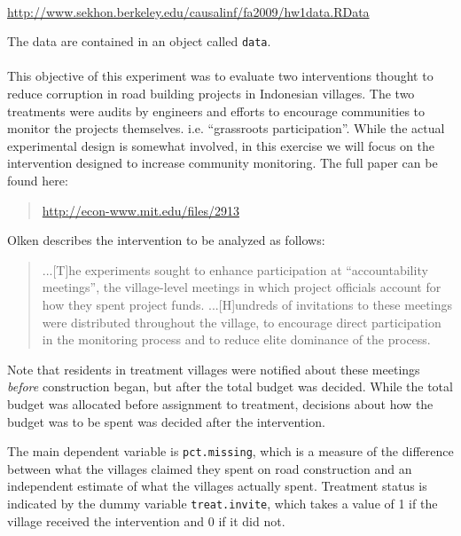 \documentclass{article}
\begin{document}
\paragraph{}
\url{http://www.sekhon.berkeley.edu/causalinf/fa2009/hw1data.RData}

The data are contained in an object called \texttt{data}.
\paragraph{}
This objective of this experiment was to evaluate two interventions
thought to reduce corruption in road building projects in Indonesian
villages. The two treatments were audits by engineers and efforts to
encourage communities to monitor the projects
themselves. i.e. ``grassroots participation''.  While the actual
experimental design is somewhat involved, in this exercise we will
focus on the intervention designed to increase community
monitoring. The full paper can be found here:
\begin{quote}
  \url{http://econ-www.mit.edu/files/2913}
\end{quote}


Olken describes the intervention to be analyzed as follows:
\begin{quote}
  ...[T]he experiments sought to enhance participation at
  ``accountability meetings'', the village-level meetings in which
  project officials account for how they spent project
  funds. ...[H]undreds of invitations to these meetings were
  distributed throughout the village, to encourage direct
  participation in the monitoring process and to reduce elite
  dominance of the process. 
\end{quote}
Note that residents in treatment villages were notified about these meetings
\textit{before} construction began, but after the total budget
was decided. While the total budget was allocated before assignment to treatment, decisions about how the budget was to be spent was decided after the intervention. 

The main dependent variable is \texttt{pct.missing}, which is a
measure of the difference between what the villages claimed they spent
on road construction and an independent estimate of what the villages
actually spent. Treatment status is indicated by the dummy variable
\texttt{treat.invite}, which takes a value of 1 if the village
received the intervention and 0 if it did not. 
\end{document}

